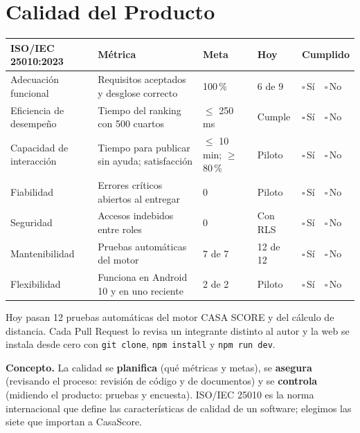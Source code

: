 \documentclass[11pt,a4paper]{article}
\newcommand{\marca}{{\Large$\square$}\,{\scriptsize Sí}\ \ {\Large$\square$}\,{\scriptsize No}}
\begin{document}
\section{Calidad del Producto}
{\small
{}
\noindent\begin{tabularx}{\textwidth}{@{}P{3.4cm} L C{2.2cm} C{1.4cm} C{2.0cm}@{}}
\toprule
{}
\textbf{ISO/IEC 25010:2023} & \textbf{Métrica} & \textbf{Meta} & \textbf{Hoy} & \textbf{Cumplido} \\
\midrule
Adecuación funcional & Requisitos aceptados y desglose correcto & 100\,\% & 6 de 9 & \marca \\
Eficiencia de desempeño & Tiempo del ranking con 500 cuartos & $\le$ 250 ms & Cumple & \marca \\
Capacidad de interacción & Tiempo para publicar sin ayuda; satisfacción & $\le$ 10 min; $\ge$ 80\,\% & Piloto & \marca \\
Fiabilidad & Errores críticos abiertos al entregar & 0 & Piloto & \marca \\
Seguridad & Accesos indebidos entre roles & 0 & Con RLS & \marca \\
Mantenibilidad & Pruebas automáticas del motor & 7 de 7 & 12 de 12 & \marca \\
Flexibilidad & Funciona en Android 10 y en uno reciente & 2 de 2 & Piloto & \marca \\
\bottomrule
\end{tabularx}
}

\vspace{0.1cm}
{\small\noindent Hoy pasan 12 pruebas automáticas del motor CASA SCORE y del cálculo de distancia. Cada Pull Request lo revisa un integrante distinto al autor y la web se instala desde cero con \texttt{git clone}, \texttt{npm install} y \texttt{npm run dev}.}

\vspace{0.1cm}
{\small\noindent\textbf{Concepto.} La calidad se \textbf{planifica} (qué métricas y metas), se \textbf{asegura} (revisando el proceso: revisión de código y de documentos) y se \textbf{controla} (midiendo el producto: pruebas y encuesta). ISO/IEC 25010 es la norma internacional que define las características de calidad de un software; elegimos las siete que importan a CasaScore.}

\end{document}
